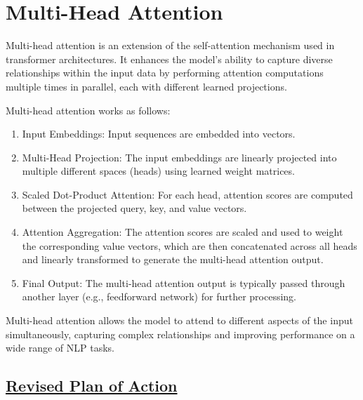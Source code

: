 \documentclass{article}
\begin{document}
\section{\Huge Multi-Head Attention}
Multi-head attention is an extension of the self-attention mechanism used in transformer architectures. It enhances the model's ability to capture diverse relationships within the input data by performing attention computations multiple times in parallel, each with different learned projections.

Multi-head attention works as follows:
\begin{enumerate}
\item Input Embeddings: Input sequences are embedded into vectors.
\item Multi-Head Projection: The input embeddings are linearly projected into multiple different spaces (heads) using learned weight matrices.
\item Scaled Dot-Product Attention: For each head, attention scores are computed between the projected query, key, and value vectors.
\item Attention Aggregation: The attention scores are scaled and used to weight the corresponding value vectors, which are then concatenated across all heads and linearly transformed to generate the multi-head attention output.
\item Final Output: The multi-head attention output is typically passed through another layer (e.g., feedforward network) for further processing.
\end{enumerate}
Multi-head attention allows the model to attend to different aspects of the input simultaneously, capturing complex relationships and improving performance on a wide range of NLP tasks.

\newpage

\begin{center}
    \section*{\Huge \underline{Revised Plan of Action}}
\end{center}

\vspace{0.5cm}
\end{document}
